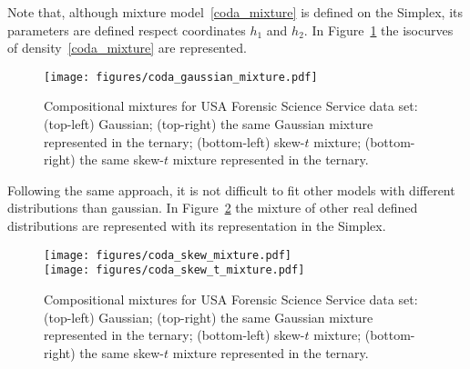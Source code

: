 \documentclass[10pt, a4paper]{article}
\begin{document}
{\small  }

Note that, although mixture model~\ref{coda_mixture} is defined on the Simplex, its parameters are defined respect coordinates $h_1$ and $h_2$. In Figure~\ref{fig07fittingcodaGaussian} the isocurves of density~\ref{coda_mixture} are represented.

\begin{figure}[htbp]
\centering
\texttt{[image: figures/coda\_gaussian\_mixture.pdf]}\\
\caption{Compositional mixtures for USA Forensic Science Service data set: (top-left) Gaussian; (top-right) the same Gaussian mixture represented in the ternary; (bottom-left) skew-$t$ mixture; (bottom-right) the same skew-$t$ mixture represented in the ternary. }
\label{fig07fittingcodaGaussian}
\end{figure}



Following the same approach, it is not difficult to fit other models with different distributions than gaussian. In Figure~\ref{othercodadist} the mixture of other real defined distributions are represented with its representation in the Simplex.

\begin{figure}[htbp]
\centering
\texttt{[image: figures/coda\_skew\_mixture.pdf]}\\%
\texttt{[image: figures/coda\_skew\_t\_mixture.pdf]}%
\caption{Compositional mixtures for USA Forensic Science Service data set: (top-left) Gaussian; (top-right) the same Gaussian mixture represented in the ternary; (bottom-left) skew-$t$ mixture; (bottom-right) the same skew-$t$ mixture represented in the ternary. }
\label{othercodadist}
\end{figure}
\end{document}

